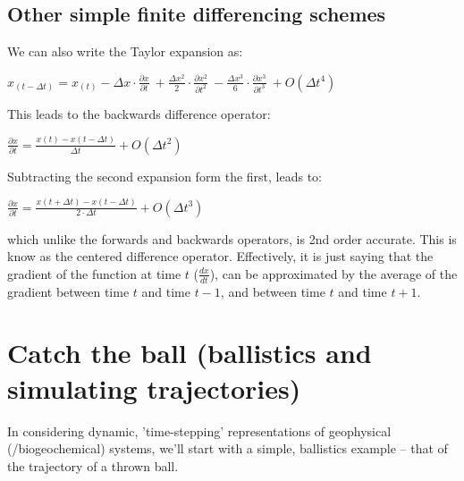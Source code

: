 \documentclass{tufte-book} %
\begin{document}

\subsection*{Other simple finite differencing schemes}

We can also write the Taylor expansion as:

\vspace{2mm}\(
x_{(t-\Delta t)}=x_{(t)} - \Delta x\cdot\frac{\partial x}{\partial t}\ + \frac{\Delta x^{2}}{2}\cdot\frac{\partial x^{2}}{\partial t^{2}}\ - \frac{\Delta x^{3}}{6}\cdot\frac{\partial x^{3}}{\partial t^{3}}\ + O(\Delta t^{4})
\)\vspace{2mm}

\noindent This leads to the backwards difference operator:

\vspace{2mm}\(
\frac{\partial x}{\partial t} = \frac{x(t)-x(t-\Delta t)}{\Delta t} + O(\Delta t^{2})
\)\vspace{2mm}

\noindent Subtracting the second expansion form the first, leads to:

\vspace{2mm}\(
\frac{\partial x}{\partial t} = \frac{x(t+\Delta t)-x(t-\Delta t)}{2\cdot\Delta t} + O(\Delta t^{3})
\)\vspace{2mm}

\noindent which unlike the forwards and backwards operators, is 2nd order accurate. This is know as the centered difference operator. Effectively, it is just saying that the gradient of the function at time \(t\) (\(\frac{dx}{dt}\)), can be approximated by the average of the gradient between time \(t\) and time \(t-1\), and between  time \(t\) and time \(t+1\).

\newpage

\section{Catch the ball (ballistics and simulating trajectories)}

In considering dynamic, 'time-stepping' representations of geophysical (/biogeochemical) systems, we'll start with a simple, ballistics example -- that of the trajectory of a thrown ball.
\end{document}
